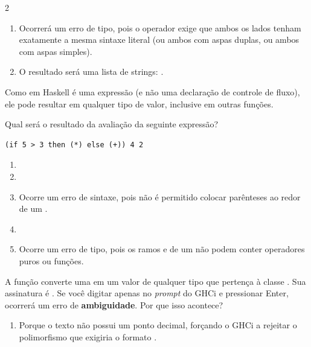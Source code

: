 \documentclass[a4paper,10pt,brazil]{article}
\begin{document}
\begin{multicols}{2}
\begin{enumerate}
  \item Ocorrerá um erro de tipo, pois o operador \haskellinline{++} exige que ambos os lados tenham exatamente a mesma sintaxe literal (ou ambos com aspas duplas, ou ambos com aspas simples).

  \item O resultado será uma lista de strings: \haskellinline{["Ha", "skell"]}.


\end{enumerate}

Como  em Haskell é uma expressão (e não uma declaração de controle de fluxo), ele pode resultar em qualquer tipo de valor, inclusive em outras funções. 

Qual será o resultado da avaliação da seguinte expressão?
\begin{verbatim}
(if 5 > 3 then (*) else (+)) 4 2
\end{verbatim}

\begin{enumerate}
  \item {}

  \item {}

  \item Ocorre um erro de sintaxe, pois não é permitido colocar parênteses ao redor de um .

  \item {}

  \item Ocorre um erro de tipo, pois os ramos  e  de um  não podem conter operadores puros ou funções.


\end{enumerate}

A função  converte uma  em um valor de qualquer tipo que pertença à classe . Sua assinatura é . 
Se você digitar apenas  no \emph{prompt} do GHCi e pressionar Enter, ocorrerá um erro de \textbf{ambiguidade}. Por que isso acontece?

\begin{enumerate}
  \item Porque o texto  não possui um ponto decimal, forçando o GHCi a rejeitar o polimorfismo que exigiria o formato .


\end{enumerate}
\end{multicols}
\end{document}

